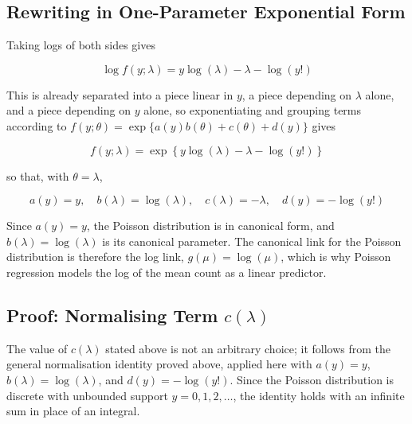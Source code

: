 \subsection*{Rewriting in One-Parameter Exponential Form}
Taking logs of both sides gives
\begin{mathbox}
\[
\log f(y;\lambda) = y\log(\lambda) - \lambda - \log(y!)
\]
\end{mathbox}
This is already separated into a piece linear in $y$, a piece depending on $\lambda$ alone, and a piece depending on $y$ alone, so exponentiating and grouping terms according to $f(y;\theta)=\exp\{a(y)b(\theta)+c(\theta)+d(y)\}$ gives
\begin{mathbox}
\[
f(y;\lambda) = \exp\left\{y\log(\lambda) - \lambda - \log(y!)\right\}
\]
\end{mathbox}
so that, with $\theta=\lambda$,
\begin{mathbox}
\[
a(y)=y,\quad b(\lambda)=\log(\lambda),\quad c(\lambda) = -\lambda,\quad d(y) = -\log(y!)
\]
\end{mathbox}
Since $a(y)=y$, the Poisson distribution is in canonical form, and $b(\lambda)=\log(\lambda)$ is its canonical parameter. The canonical link for the Poisson distribution is therefore the log link, $g(\mu)=\log(\mu)$, which is why Poisson regression models the log of the mean count as a linear predictor.

\subsection*{Proof: Normalising Term $c(\lambda)$}
The value of $c(\lambda)$ stated above is not an arbitrary choice; it follows from the general normalisation identity proved above, applied here with $a(y)=y$, $b(\lambda)=\log(\lambda)$, and $d(y)=-\log(y!)$. Since the Poisson distribution is discrete with unbounded support $y=0,1,2,\dots$, the identity holds with an infinite sum in place of an integral.

